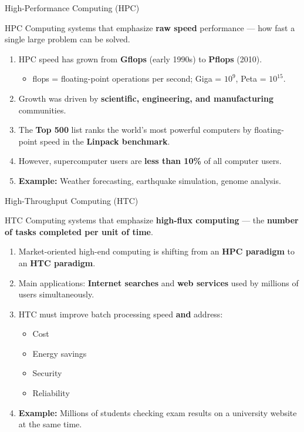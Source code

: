 \begin{frame}{High-Performance Computing (HPC)}
\begin{block}{HPC}
Computing systems that emphasize \textbf{raw speed} performance --- how fast a single large problem can be solved.
\end{block}
\vspace{0.2cm}
\begin{enumerate}
\item<1-> HPC speed has grown from \textbf{Gflops} (early 1990s) to \textbf{Pflops} (2010).
    \begin{itemize}
    \item flops = floating-point operations per second; Giga = $10^9$, Peta = $10^{15}$.
    \end{itemize}
\item<2-> Growth was driven by \textbf{scientific, engineering, and manufacturing} communities.
\item<3-> The \textbf{Top 500} list ranks the world's most powerful computers by floating-point speed in the \textbf{Linpack benchmark}.
\item<4-> However, supercomputer users are \textbf{less than 10\%} of all computer users.
\item<5-> \textbf{Example:} Weather forecasting, earthquake simulation, genome analysis.
\end{enumerate}
\end{frame}

\begin{frame}{High-Throughput Computing (HTC)}
\begin{block}{HTC}
Computing systems that emphasize \textbf{high-flux computing} --- the \textbf{number of tasks completed per unit of time}.
\end{block}
\vspace{0.2cm}
\begin{enumerate}
\item<1-> Market-oriented high-end computing is shifting from an \textbf{HPC paradigm} to an \textbf{HTC paradigm}.
\item<2-> Main applications: \textbf{Internet searches} and \textbf{web services} used by millions of users simultaneously.
\item<3-> HTC must improve batch processing speed \textbf{and} address:
    \begin{itemize}
    \item Cost
    \item Energy savings
    \item Security
    \item Reliability
    \end{itemize}
\item<4-> \textbf{Example:} Millions of students checking exam results on a university website at the same time.
\end{enumerate}
\end{frame}

